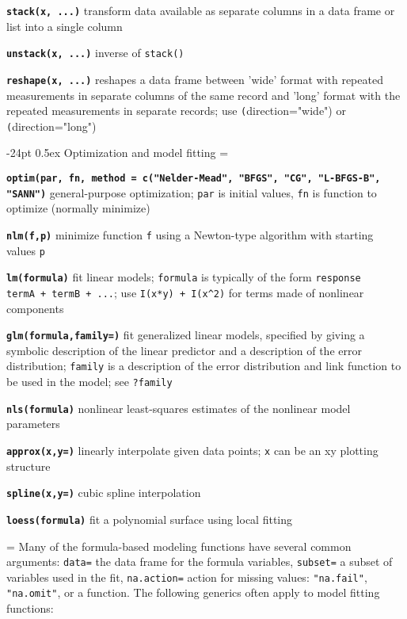 \documentclass[10pt,landscape]{article}
\makeatletter
\renewcommand\section{\@startsection{section}{1}{0mm}%
                                     {-24pt}%
                                     {0.5ex}%
                                {\color{blue}\normalfont\large\bfseries}}
\newcommand{\code}{\texttt}
\newcommand{\bcode}[1]{\texttt{\textbf{#1}}}
\makeatother
\begin{document}
\begin{multicols*}{3}
\bcode{stack(x, ...)} transform data available as
     separate columns in a data frame or list into a single column

\bcode{unstack(x, ...)} inverse of \code{stack()}

\bcode{reshape(x, ...)} reshapes a data frame between 'wide' format with
     repeated measurements in separate columns of the same record and
     'long' format with the repeated measurements in separate records;
     use \code(direction="wide") or \code(direction="long")

\section{Optimization and model fitting}
\everypar={\hangindent=9mm}

\bcode{optim(par, fn, method = c("Nelder-Mead", "BFGS", "CG",
  "L-BFGS-B", "SANN")} general-purpose optimization; \code{par} is
  initial values, \code{fn} is function to optimize (normally minimize)

\bcode{nlm(f,p)} minimize function \code{f} using a Newton-type
algorithm with starting values \code{p}

\bcode{lm(formula)} fit linear models; \code{formula} is typically of
     the form \code{response ~ termA + termB + ...}; use \code{I(x*y)
     + I(x\^{}2)} for terms made of nonlinear components

\bcode{glm(formula,family=)} fit generalized linear models, specified by
     giving a symbolic description of the linear predictor and a
     description of the error distribution; \code{family} is a
     description of the error distribution and link function to
          be used in the model; see \code{?family}

\bcode{nls(formula)} nonlinear least-squares estimates of the nonlinear
     model parameters

\bcode{approx(x,y=)} linearly interpolate given data points; \code{x} can be an
xy plotting structure

\bcode{spline(x,y=)} cubic spline interpolation

\bcode{loess(formula)} fit a polynomial surface using local fitting

\everypar={\hangindent=0mm}
Many of the formula-based modeling functions have several common
arguments: \code{data=} the data frame for the formula variables,
\code{subset=} a subset of variables used in the fit,
\code{na.action=} action for missing values: \code{"na.fail"}, \code{"na.omit"}, or
a function. The following generics often apply to model fitting functions:


\end{multicols*}
\end{document}
